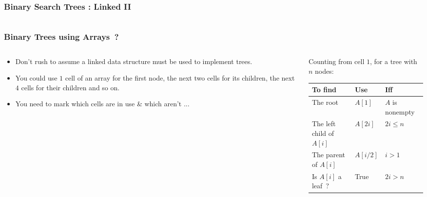
\begin{frame}[fragile]
\frametitle{Binary Search Trees : Linked II}
\begin{columns}[T]

\begin{column}{0.45\textwidth}

\end{column}

\pause
\begin{column}{0.45\textwidth}

\end{column}

\end{columns}
\end{frame}


\begin{frame}[fragile]
\frametitle{Binary Trees using Arrays~?}
\begin{columns}[T]

\begin{column}{0.35\textwidth}
\begin{itemize}[<+->]
\item Don't rush to assume a linked data structure must be used to
implement trees.
\item You could use $1$ cell of an array for the
first node, the next two cells for its children, the next $4$
cells for their children and so on.
\item You need to mark which cells are in use \& which aren't ...
\end{itemize}
\end{column}

\pause
\begin{column}{0.55\textwidth}
Counting from cell $1$, for a tree with $n$ nodes:
\begin{center}	
\begin{tabular}{|l|l|l|}\hline	
To find & Use & Iff\\ \hline	
The root & $A[1]$ & $A$ is nonempty \\	
The left child of $A[i]$ & $A[2i]$ & $2i \leq n$ \\	
The parent of $A[i]$ & $A[i/2]$ & $i > 1$\\	
Is $A[i]$ a leaf~? & True & $2i > n$\\ \hline	
\end{tabular}	
\end{center}	
\end{column}

\end{columns}
\end{frame}


